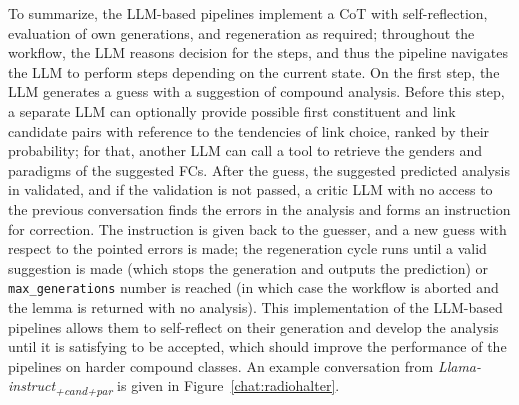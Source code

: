 \documentclass[11pt]{article}
\begin{document}
To summarize, the LLM-based pipelines implement a CoT with self-reflection, evaluation of own generations, and regeneration as required; throughout the workflow, the LLM reasons decision for the steps, and thus the pipeline navigates the LLM to perform steps depending on the current state. On the first step, the LLM generates a guess with a suggestion of compound analysis. Before this step, a separate LLM can optionally provide possible first constituent and link candidate pairs with reference to the tendencies of link choice, ranked by their probability; for that, another LLM can call a tool to retrieve the genders and paradigms of the suggested FCs. After the guess, the suggested predicted analysis in validated, and if the validation is not passed, a critic LLM with no access to the previous conversation finds the errors in the analysis and forms an instruction for correction. The instruction is given back to the guesser, and a new guess with respect to the pointed errors is made; the regeneration cycle runs until a valid suggestion is made (which stops the generation and outputs the prediction) or \texttt{max\_generations} number is reached (in which case the workflow is aborted and the lemma is returned with no analysis). This implementation of the LLM-based pipelines allows them to self-reflect on their generation and develop the analysis until it is satisfying to be accepted, which should improve the performance of the pipelines on harder compound classes. An example conversation from \textit{Llama-instruct\textsubscript{+cand+par}} is given in Figure~\ref{chat:radiohalter}.
\end{document}
